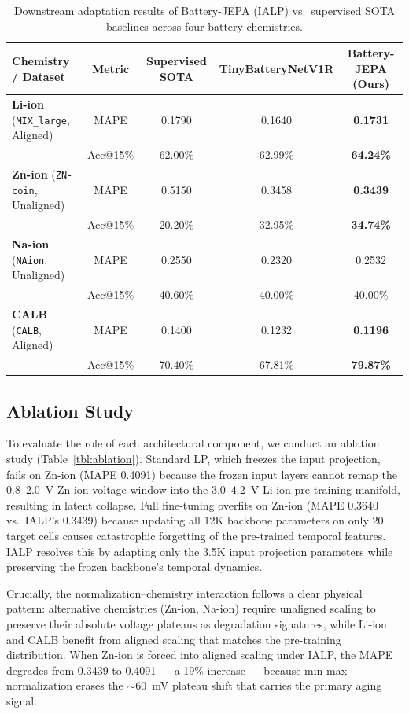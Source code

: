 \documentclass[a4paper,fleqn]{cas-dc}
\begin{document}
\begin{table}[t]
\caption{Downstream adaptation results of Battery-JEPA (IALP) vs.\ supervised SOTA baselines across four battery chemistries.}
\label{tbl:overall_results}
\centering
\small
\begin{tabular*}{\textwidth}{@{\extracolsep{\fill}}lcccc@{}}
\toprule
Chemistry / Dataset & Metric & Supervised SOTA & TinyBatteryNetV1R & Battery-JEPA (Ours) \\
\midrule
\textbf{Li-ion} (\texttt{MIX\_large}, Aligned) & MAPE & 0.1790 & 0.1640 & \textbf{0.1731} \\
 & Acc@15\% & 62.00\% & 62.99\% & \textbf{64.24\%} \\
\midrule
\textbf{Zn-ion} (\texttt{ZN-coin}, Unaligned) & MAPE & 0.5150 & 0.3458 & \textbf{0.3439} \\
 & Acc@15\% & 20.20\% & 32.95\% & \textbf{34.74\%} \\
\midrule
\textbf{Na-ion} (\texttt{NAion}, Unaligned) & MAPE & 0.2550 & 0.2320 & 0.2532 \\
 & Acc@15\% & 40.60\% & 40.00\% & 40.00\% \\
\midrule
\textbf{CALB} (\texttt{CALB}, Aligned) & MAPE & 0.1400 & 0.1232 & \textbf{0.1196} \\
 & Acc@15\% & 70.40\% & 67.81\% & \textbf{79.87\%} \\
\bottomrule
\end{tabular*}
\end{table}

\subsection{Ablation Study}
To evaluate the role of each architectural component, we conduct an ablation study (Table~\ref{tbl:ablation}). Standard LP, which freezes the input projection, fails on Zn-ion (MAPE 0.4091) because the frozen input layers cannot remap the 0.8--2.0~V Zn-ion voltage window into the 3.0--4.2~V Li-ion pre-training manifold, resulting in latent collapse. Full fine-tuning overfits on Zn-ion (MAPE 0.3640 vs.\ IALP's 0.3439) because updating all 12K backbone parameters on only 20 target cells causes catastrophic forgetting of the pre-trained temporal features. IALP resolves this by adapting only the 3.5K input projection parameters while preserving the frozen backbone's temporal dynamics.

Crucially, the normalization--chemistry interaction follows a clear physical pattern: alternative chemistries (Zn-ion, Na-ion) require unaligned scaling to preserve their absolute voltage plateaus as degradation signatures, while Li-ion and CALB benefit from aligned scaling that matches the pre-training distribution. When Zn-ion is forced into aligned scaling under IALP, the MAPE degrades from 0.3439 to 0.4091 --- a 19\% increase --- because min-max normalization erases the $\sim$60~mV plateau shift that carries the primary aging signal.
\end{document}
